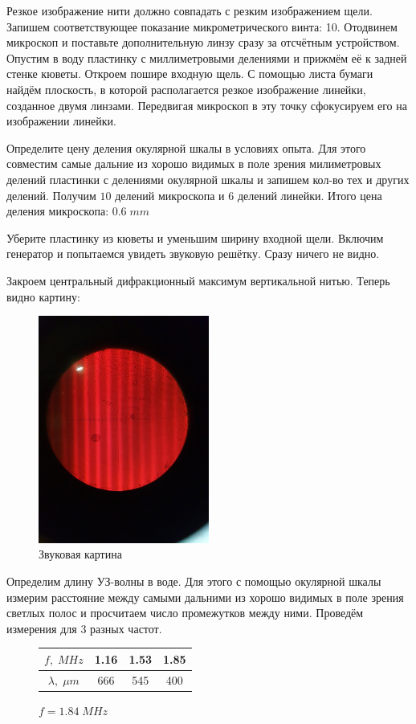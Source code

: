 \documentclass{article}
\begin{document}
Резкое изображение нити должно совпадать с резким изображением щели. Запишем
соответствующее показание микрометрического винта: 10. Отодвинем микроскоп
и поставьте дополнительную линзу сразу за отсчётным устройством. Опустим в
воду пластинку с миллиметровыми делениями и прижмём её к задней стенке кюветы.
Откроем пошире входную щель. С помощью листа бумаги найдём плоскость, в которой
располагается резкое изображение линейки, созданное двумя линзами. Передвигая
микроскоп в эту точку сфокусируем его на изображении линейки. 

Определите цену деления окулярной шкалы в условиях опыта. Для этого совместим
самые дальние из хорошо видимых в поле зрения милиметровых делений пластинки
с делениями окулярной шкалы и запишем кол-во тех и других делений.
Получим \(10\) делений микроскопа и \(6\) делений линейки. Итого цена деления
микроскопа: \(0.6 \; mm\)

Уберите пластинку из кюветы и уменьшим ширину входной щели. Включим генератор и 
попытаемся увидеть звуковую решётку. Сразу ничего не видно.

Закроем центральный дифракционный максимум вертикальной нитью. Теперь видно
картину:

\begin{figure}[H]
  \centering
  \includegraphics[width=0.5\textwidth]{red-lines.jpg}
  \caption{Звуковая картина}
  \label{fig:red-lines}
\end{figure}

Определим длину УЗ-волны в воде. Для этого с помощью окулярной шкалы измерим
расстояние между самыми дальними из хорошо видимых в поле зрения светлых полос
и просчитаем число промежутков между ними. Проведём измерения для 3 разных
частот.
\begin{figure}[H]
  \centering
  \begin{tabular}{|c|c|c|c|}
    \hline
    \(f, \; MHz\) & 1.16 & 1.53 & 1.85 \\\hline
    \(\lambda,\; \mu m\) & 666 & 545 & 400\\\hline
  \end{tabular}
  \caption{\(f = 1.84\; MHz\)}
\end{figure}
\end{document}
